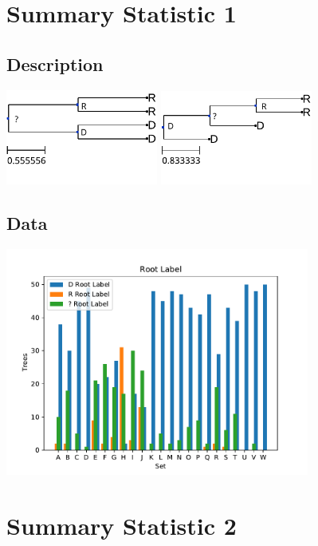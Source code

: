 \documentclass[
10pt,aspectratio=169,notheorems,hyperref={pdfauthor=whatever}
]{beamer}
\begin{document}
\section{Summary Statistic 1}
\subsection{Description}
\begin{frame}
  \centering
  \includegraphics[width=5cm, angle=0]{sumstat1example}
  \includegraphics[width=5cm, angle=0]{sumstat1example2}
\end{frame}

\subsection{Data}
\begin{frame}
  \centering
  \includegraphics[width=10cm, angle=0]{sumstat1graph}
\end{frame}

\section{Summary Statistic 2}
\end{document}
